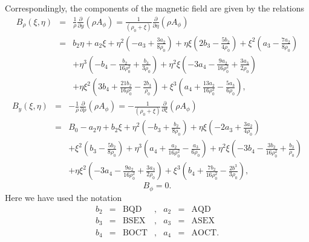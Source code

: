 Correspondingly, the components of the magnetic field are given by the relations
\begin{eqnarray}
B_{\rho}(\xi,\eta) &= & \displaystyle \frac{1}{\rho} \frac{\partial}{\partial y} (\rho A_{\phi}) = \frac{1}{(\rho_0 + \xi )} \frac{\partial}{\partial \eta} (\rho A_{\phi}) \nonumber \\
&= & \displaystyle b_2 \eta +a_2\xi +\eta^2(-a_3 + \frac{3a_2}{8\rho_0})
+ \eta\xi(2b_3 - \frac{5b_2}{4\rho_0}) + \xi^2(a_3-\frac{7a_2}{8\rho_0}) \nonumber \\
& &\displaystyle + \eta^3(-b_4 - \frac{b_2}{16\rho_0^2} + \frac{b_3}{3\rho_0}) +\eta^2\xi(-3a_4 - \frac{9a_2}{16\rho_0^2} +\frac{3a_3}{2\rho_0})\nonumber \\
& &\displaystyle + \eta\xi^2(3b_4 + \frac{21b_2}{16\rho_0^2} - \frac{2b_3}{\rho_0})
+ \xi^3(a_4 + \frac{13a_2}{16\rho_0^2} - \frac{5a_3}{6\rho_0}),
\end{eqnarray}
\begin{eqnarray}
B_y(\xi,\eta) &= &\displaystyle -\frac{1}{\rho} \frac{\partial}{\partial \rho} (\rho A_{\phi}) = -\frac{1}{(\rho_0 + \xi)} \frac{\partial}{\partial \xi} (\rho A_{\phi}) \nonumber \\
&= &\displaystyle B_0-a_2\eta + b_2\xi + \eta^2(-b_3 + \frac{b_2}{8\rho_0}) + \eta\xi(-2a_3 + \frac{3a_2}{4\rho_0}) \nonumber \\
& &\displaystyle + \xi^2(b_3 - \frac{5b_2}{8\rho_0}) + \eta^3(
a_4 + \frac{a_2}{16\rho_0^2} - \frac{a_3}{6\rho_0}) + \eta^2\xi(
-3b_4 - \frac{3b_2}{16\rho_0^2} + \frac{b_3}{\rho_0}) \nonumber \\
& &\displaystyle + \eta\xi^2(-3a_4 - \frac{9a_2}{16\rho_0^2} + \frac{3a_3}{2\rho_0})
+\xi^3(b_4 + \frac{7b_2}{16\rho_0^2} - \frac{2b^3}{3\rho_0}),
\end{eqnarray}
\begin{equation}
B_{\phi} = 0.
\end{equation}
Here we have used the notation
\[
\begin{array}{lclclcl}
b_2&=&\mbox{BQD}&,&a_2&=&\mbox{AQD}\\
b_3&=&\mbox{BSEX}&,&a_3&=&\mbox{ASEX}\\
b_4&=&\mbox{BOCT}&,&a_4&=&\mbox{AOCT}.
\end{array} \]

